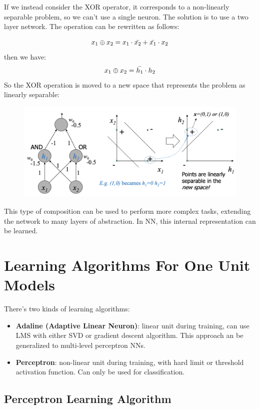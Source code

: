 If we instead consider the XOR operator, it corresponds to a non-linearly separable problem, so we can't use a single neuron. The solution is to use a two layer network. The operation can be rewritten as follows:

\begin{equation*}
    x_1 \oplus x_2 = x_1 \cdot \Bar{x_2} + \Bar{x_1} \cdot x_2
\end{equation*}
then we have:
\begin{equation*}
    x_1 \oplus x_2 = \Bar{h_1} \cdot h_2
\end{equation*}
So the XOR operation is moved to a new space that represents the problem as linearly separable:
\begin{figure}[h]
    \centering
    \includegraphics[width=0.55\linewidth]{img/xor perceptron.png}
\end{figure}
This type of composition can be used to perform more complex tasks, extending the network to many layers of abstraction. In NN, this internal representation can be learned.

\section{Learning Algorithms For One Unit Models}

There's two kinds of learning algorithms:
\begin{itemize}
    \item \textbf{Adaline (Adaptive Linear Neuron)}: linear unit during training, can use LMS with either SVD or gradient descent algorithm. This approach an be generalized to multi-level perceptron NNs.

    \item \textbf{Perceptron}: non-linear unit during training, with hard limit or threshold activation function. Can only be used for classification.
\end{itemize}

\subsection{Perceptron Learning Algorithm}

